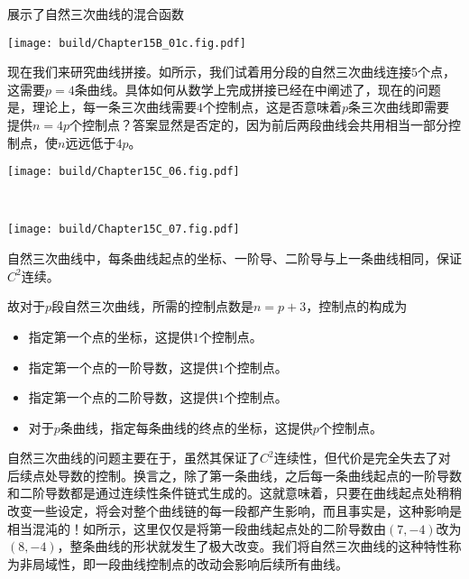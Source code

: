 展示了自然三次曲线的混合函数
\begin{Figure}[自然三次曲线的混合函数]
    \texttt{[image: build/Chapter15B\_01c.fig.pdf]}
\end{Figure}
现在我们来研究曲线拼接。如所示，我们试着用分段的自然三次曲线连接$5$个点，这需要$p=4$条曲线。具体如何从数学上完成拼接已经在中阐述了，现在的问题是，理论上，每一条三次曲线需要$4$个控制点，这是否意味着$p$条三次曲线即需要提供$n=4p$个控制点？答案显然是否定的，因为前后两段曲线会共用相当一部分控制点，使$n$远远低于$4p$。


\begin{Figure}[自然三次曲线构成的分段曲线]
    \begin{FigureSub}[设定1;自然设定1]
        \texttt{[image: build/Chapter15C\_06.fig.pdf]}
    \end{FigureSub}\\ \vspace{0.25cm}
    \begin{FigureSub}[设定2;自然设定2]
        \texttt{[image: build/Chapter15C\_07.fig.pdf]}
    \end{FigureSub}
\end{Figure}

自然三次曲线中，每条曲线起点的坐标、一阶导、二阶导与上一条曲线相同，保证$C^2$连续。

故对于$p$段自然三次曲线，所需的控制点数是$n=p+3$，控制点的构成为
\begin{itemize}
    \item 指定第一个点的坐标，这提供$1$个控制点。
    \item 指定第一个点的一阶导数，这提供$1$个控制点。
    \item 指定第一个点的二阶导数，这提供$1$个控制点。
    \item 对于$p$条曲线，指定每条曲线的终点的坐标，这提供$p$个控制点。
\end{itemize}
自然三次曲线的问题主要在于，虽然其保证了$C^2$连续性，但代价是完全失去了对后续点处导数的控制。换言之，除了第一条曲线，之后每一条曲线起点的一阶导数和二阶导数都是通过连续性条件链式生成的。这就意味着，只要在曲线起点处稍稍改变一些设定，将会对整个曲线链的每一段都产生影响，而且事实是，这种影响是相当混沌的！如所示，这里仅仅是将第一段曲线起点处的二阶导数由$(7,-4)$改为$(8,-4)$，整条曲线的形状就发生了极大改变。我们将自然三次曲线的这种特性称为非局域性，即一段曲线控制点的改动会影响后续所有曲线。

